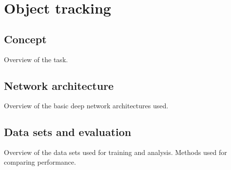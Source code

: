 \section{Object tracking}

\subsection{Concept}
Overview of the task.

\subsection{Network architecture}
Overview of the basic deep network architectures used.

\subsection{Data sets and evaluation}
Overview of the data sets used for training and analysis. Methods used for comparing
performance.
